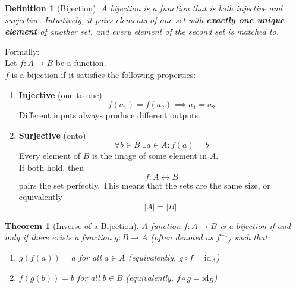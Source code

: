 \documentclass{article}
\newtheorem{theorem}{Theorem}
\newtheorem{definition}{Definition}
\begin{document}
\begin{definition}[Bijection]
    A bijection is a function that is both injective and surjective. Intuitively, it pairs elements of one set with \textbf{exactly one unique element} of another set, and every element of the second set is matched to.
\end{definition}
    Formally:\\
    Let $f : A \rightarrow B$ be a function.\\
    $f$ is a bijection if it satisfies the following properties:
    \begin{enumerate}
        \item \textbf{Injective} (one-to-one)
        \[
            f(a_1) = f(a_2) \implies a_1 = a_2
        \]
        Different inputs always produce different outputs.
        \item \textbf{Surjective} (onto)
        \[
            \forall b \in B \: \exists a \in A : f(a) = b
        \]
        Every element of $B$ is the image of some element in $A$.\\
        If both hold, then
        \[
        f : A \leftrightarrow B
        \]
        pairs the set perfectly. This means that the sets are the same size, or equivalently
        \[
        |A| = |B|.
        \]
    \end{enumerate}

\begin{theorem}[Inverse of a Bijection]
    A function $f: A \rightarrow B$ is a bijection if and only if there exists a function $g: B \rightarrow A$ (often denoted as $f^{-1}$) such that:
    \begin{enumerate}
        \item $g(f(a)) = a$ for all $a \in A$ (equivalently, $g \circ f = \text{id}_A$)
        \item $f(g(b)) = b$ for all $b \in B$ (equivalently, $f \circ g = \text{id}_B$)
    \end{enumerate}
\end{theorem}
\end{document}
